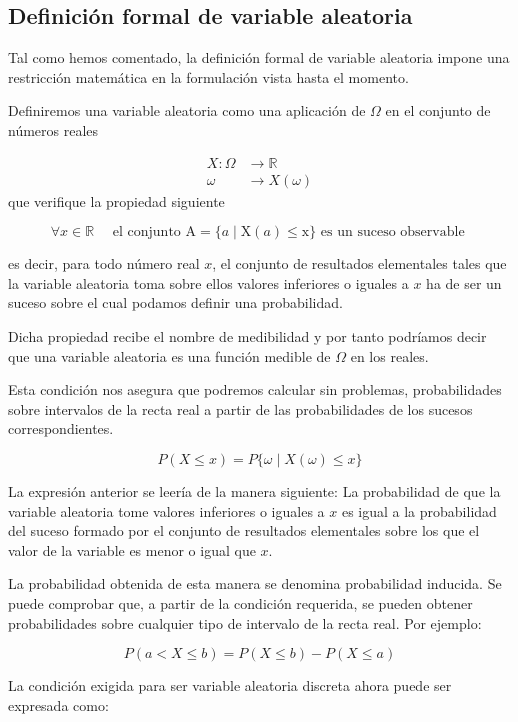 \documentclass[
]{article}
\begin{document}
\subsection{Definición formal de variable aleatoria}\label{definiciuxf3n-formal-de-variable-aleatoria}

Tal como hemos comentado, la definición formal de variable aleatoria
impone una restricción matemática en la formulación vista hasta el
momento.

Definiremos una variable aleatoria como una aplicación de \(\Omega\) en el
conjunto de números reales

\[
\begin{aligned}
X: \Omega & \rightarrow \mathbb{R} \\
\omega & \rightarrow X(\omega)
\end{aligned}
\] que verifique la propiedad siguiente

\[
\forall x \in \mathbb{R} \quad \text { el conjunto } \mathrm{A}=\{a \mid \mathrm{X}(a) \leq \mathrm{x}\} \text { es un suceso observable }
\]

es decir, para todo número real \(x\), el conjunto de resultados
elementales tales que la variable aleatoria toma sobre ellos valores
inferiores o iguales a \(x\) ha de ser un suceso sobre el cual podamos
definir una probabilidad.

Dicha propiedad recibe el nombre de medibilidad y por tanto podríamos
decir que una variable aleatoria es una función medible de \(\Omega\) en
los reales.

Esta condición nos asegura que podremos calcular sin problemas,
probabilidades sobre intervalos de la recta real a partir de las
probabilidades de los sucesos correspondientes.

\[
P(X \leq x)=P\{\omega \mid X(\omega) \leq x\}
\]

La expresión anterior se leería de la manera siguiente: La probabilidad
de que la variable aleatoria tome valores inferiores o iguales a \(x\) es
igual a la probabilidad del suceso formado por el conjunto de resultados
elementales sobre los que el valor de la variable es menor o igual que
\(x\).

La probabilidad obtenida de esta manera se denomina probabilidad
inducida. Se puede comprobar que, a partir de la condición requerida, se
pueden obtener probabilidades sobre cualquier tipo de intervalo de la
recta real. Por ejemplo:

\[
P(a<X \leq b)=P(X \leq b)-P(X \leq a)
\]

La condición exigida para ser variable aleatoria discreta ahora puede
ser expresada como:
\end{document}
